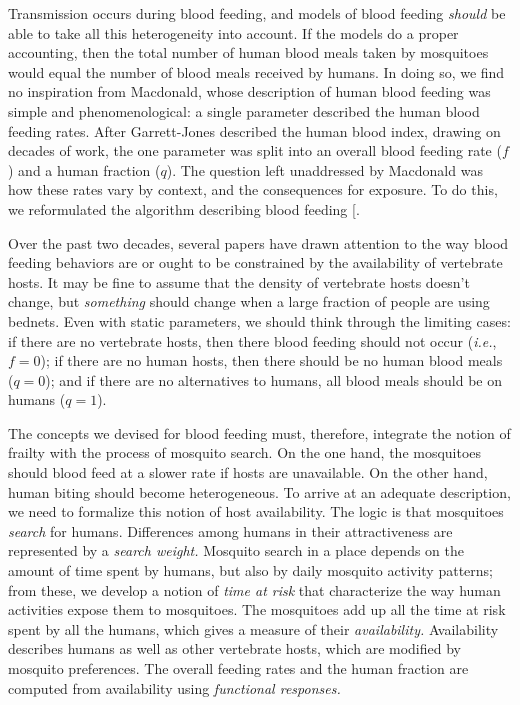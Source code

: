 \documentclass[
]{book}
\begin{document}
Transmission occurs during blood feeding, and models of blood feeding \emph{should} be able to take all this heterogeneity into account. If the models do a proper accounting, then the total number of human blood meals taken by mosquitoes would equal the number of blood meals received by humans. In doing so, we find no inspiration from Macdonald, whose description of human blood feeding was simple and phenomenological: a single parameter described the human blood feeding rates. After Garrett-Jones described the human blood index, drawing on decades of work, the one parameter was split into an overall blood feeding rate (\(f\)) and a human fraction (\(q\)). The question left unaddressed by Macdonald was how these rates vary by context, and the consequences for exposure. To do this, we reformulated the algorithm describing blood feeding {[}\citeproc{ref-WuSL2023SpatialDynamics}{11}{]}.

Over the past two decades, several papers have drawn attention to the way blood feeding behaviors are or ought to be constrained by the availability of vertebrate hosts. It may be fine to assume that the density of vertebrate hosts doesn't change, but \emph{something} should change when a large fraction of people are using bednets. Even with static parameters, we should think through the limiting cases: if there are no vertebrate hosts, then there blood feeding should not occur (\emph{i.e.}, \(f=0\)); if there are no human hosts, then there should be no human blood meals (\(q=0\)); and if there are no alternatives to humans, all blood meals should be on humans (\(q=1\)).

The concepts we devised for blood feeding must, therefore, integrate the notion of frailty with the process of mosquito search. On the one hand, the mosquitoes should blood feed at a slower rate if hosts are unavailable. On the other hand, human biting should become heterogeneous. To arrive at an adequate description, we need to formalize this notion of host availability.
The logic is that mosquitoes \emph{search} for humans. Differences among humans in their attractiveness are represented by a \emph{search weight.} Mosquito search in a place depends on the amount of time spent by humans, but also by daily mosquito activity patterns; from these, we develop a notion of \emph{time at risk} that characterize the way human activities expose them to mosquitoes. The mosquitoes add up all the time at risk spent by all the humans, which gives a measure of their \emph{availability.} Availability describes humans as well as other vertebrate hosts, which are modified by mosquito preferences. The overall feeding rates and the human fraction are computed from availability using \emph{functional responses.}
\end{document}
